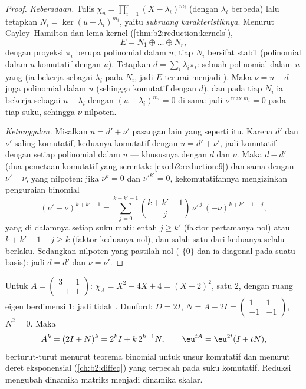 \begin{proof}
\emph{Keberadaan.} Tulis $\chi_u = \prod_{i=1}^{r} (X -
\lambda_i)^{m_i}$ (dengan $\lambda_i$ berbeda) lalu tetapkan $N_i = \ker(u -
\lambda_i)^{m_i}$, yaitu \emph{subruang karakteristiknya}. Menurut
Cayley--Hamilton dan lema kernel
(\cref{thm:b2:reduction:kernels}),
\[
E = N_1 \oplus \dots \oplus N_r ,
\]
dengan proyeksi $\pi_i$ berupa polinomial dalam $u$; tiap $N_i$ bersifat
stabil (polinomial dalam $u$ komutatif dengan $u$). Tetapkan $d = \sum_i
\lambda_i \pi_i$: sebuah polinomial dalam $u$ yang 
(ia bekerja sebagai $\lambda_i$ pada $N_i$, jadi $E$ terurai menjadi
). Maka $\nu = u - d$ juga polinomial dalam $u$ (sehingga
komutatif dengan $d$), dan pada tiap $N_i$ ia bekerja sebagai $u -
\lambda_i$ dengan $(u - \lambda_i)^{m_i} = 0$ di sana: jadi
$\nu^{\max m_i} = 0$ pada tiap suku, sehingga $\nu$ nilpoten.

\emph{Ketunggalan.} Misalkan $u = d' + \nu'$ pasangan lain yang seperti
itu. Karena $d'$ dan $\nu'$ saling komutatif, keduanya komutatif dengan
$u = d' + \nu'$, jadi komutatif dengan setiap polinomial dalam $u$ ---
khususnya dengan $d$ dan $\nu$. Maka $d - d'$  (dua
pemetaan komutatif yang   serentak:
\cref{exo:b2:reduction:9}) dan sama dengan $\nu' - \nu$, yang
nilpoten: jika $\nu^k = 0$ dan $\nu'^{k'} = 0$, kekomutatifannya
mengizinkan penguraian binomial
\[
(\nu' - \nu)^{k + k' - 1}
= \sum_{j=0}^{k+k'-1}\binom{k + k' - 1}{j}
\,\nu'^{\,j}\,(-\nu)^{k + k' - 1 - j} ,
\]
yang di dalamnya setiap suku mati: entah $j \geq k'$ (faktor pertamanya
nol) atau $k + k' - 1 - j \geq k$ (faktor keduanya nol), dan salah satu
dari keduanya selalu berlaku. Sedangkan nilpoten yang  pastilah nol ( $\{0\}$ dan ia diagonal pada
suatu basis): jadi $d = d'$ dan $\nu = \nu'$.
\end{proof}

\begin{example}\label{ex:b2:reduction:powers}
Untuk $A = \begin{pmatrix} 3 & 1\\ -1 & 1\end{pmatrix}$: $\chi_A = X^2 -
4X + 4 = (X-2)^2$, satu  $2$, dengan ruang eigen berdimensi
$1$: jadi tidak . Dunford: $D = 2I$, $N = A - 2I =
\begin{pmatrix} 1 & 1\\ -1 & -1\end{pmatrix}$, $N^2 = 0$. Maka
\[
A^k = (2I + N)^k = 2^k I + k\,2^{k-1} N ,
\qquad
\eu^{tA} = \eu^{2t}(I + tN),
\]
berturut-turut menurut teorema binomial untuk unsur komutatif dan menurut
deret eksponensial (\cref{ch:b2:diffeq}) yang terpecah pada suku
komutatif. Reduksi mengubah dinamika matriks menjadi dinamika skalar.
\end{example}

